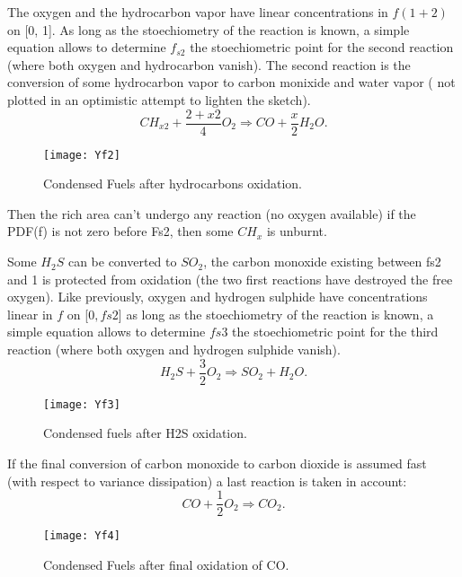 The oxygen and the hydrocarbon vapor have linear concentrations in $f(1+2)$ on [0,
1]. As long as the stoechiometry of the reaction is known, a simple equation
allows to determine $f_{s2}$ the stoechiometric point for the second reaction
({\small where both oxygen and hydrocarbon vanish}). The second reaction is the
conversion of some hydrocarbon vapor to carbon monixide and water vapor ({\small
  not plotted in an optimistic attempt to lighten the sketch}).
\begin{equation*}
CH_{x2} + \displaystyle \frac{2+x2}{4} O_{2} \Rightarrow CO + \frac{x}{2} H_{2}O. 
\end{equation*}
\begin{figure}[!htpb]
\centerline{\texttt{[image: Yf2]}}
\caption{Condensed Fuels after hydrocarbons oxidation.}
\end{figure}

Then the rich area can't undergo any reaction (no oxygen available) if the PDF(f) is not zero before Fs2, then some $CH_{x}$ is unburnt.

Some $H_{2}S$ can be converted to $SO_{2}$, the carbon monoxide existing between
fs2 and 1 is protected from oxidation (the two first reactions have destroyed
the free oxygen). Like previously, oxygen and hydrogen sulphide have
concentrations linear in $f$ on [$0,fs2$] as long as the stoechiometry of the
reaction is known, a simple equation allows to determine $fs3$ the stoechiometric
point for the third reaction (where both oxygen and hydrogen sulphide vanish).
\begin{equation*}
H_{2}S + \dfrac{3}{2} O_{2} \Rightarrow SO_{2} + H_{2}O .
\end{equation*}
\begin{figure}[!htpb]
\centerline{\texttt{[image: Yf3]}}
\caption{Condensed fuels after H2S oxidation.}
\end{figure}

If the final conversion of carbon monoxide to carbon dioxide is assumed fast
(with respect to variance dissipation) a last reaction is taken in account:
\begin{equation*}
CO + \dfrac{1}{2} O_{2} \Rightarrow CO_{2}.
\end{equation*}
\begin{figure}[!htpb]
\centerline{\texttt{[image: Yf4]}}
\caption{Condensed Fuels after final oxidation of CO.}
\end{figure}

